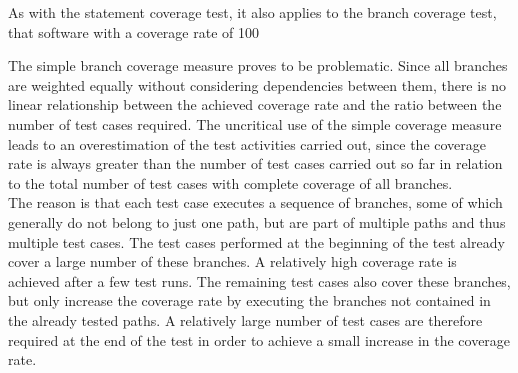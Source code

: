 \documentclass[master,english,smartquotes,apa]{hgbthesis}
\begin{document}
	As with the statement coverage test, it also applies to the branch coverage test, that software with a coverage rate of 100%

	The simple branch coverage measure proves to be problematic. Since all branches are weighted equally without considering dependencies between them, there is no linear relationship between the achieved coverage rate and the ratio between the number of test cases required. The uncritical use of the simple coverage measure leads to an overestimation of the test activities carried out, since the coverage rate is always greater than the number of test cases carried out so far in relation to the total number of test cases with complete coverage of all branches. \\

	The reason is that each test case executes a sequence of branches, some of which generally do not belong to just one path, but are part of multiple paths and thus multiple test cases. The test cases performed at the beginning of the test already cover a large number of these branches. A relatively high coverage rate is achieved after a few test runs. The remaining test cases also cover these branches, but only increase the coverage rate by executing the branches not contained in the already tested paths. A relatively large number of test cases are therefore required at the end of the test in order to achieve a small increase in the coverage rate. \\
\end{document}
